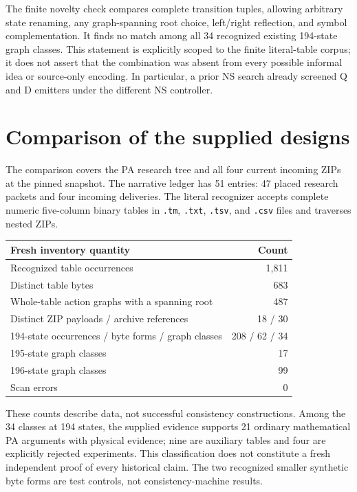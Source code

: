 \documentclass[11pt,letterpaper]{article}
\begin{document}
The finite novelty check compares complete transition tuples, allowing
arbitrary state renaming, any graph-spanning root choice, left/right
reflection, and symbol complementation. It finds no match among all 34
recognized existing 194-state graph classes. This statement is explicitly
scoped to the finite literal-table corpus; it does not assert that the
combination was absent from every possible informal idea or source-only
encoding. In particular, a prior NS search already screened Q and D
emitters under the different NS controller.

\section{Comparison of the supplied designs}
\label{sec:comparison}

The comparison covers the PA research tree and all four current incoming
ZIPs at the pinned snapshot\cite{repo}. The narrative ledger has 51 entries: 47 placed research
packets and four incoming deliveries. The literal recognizer accepts complete
numeric five-column binary tables in \texttt{.tm}, \texttt{.txt},
\texttt{.tsv}, and \texttt{.csv} files and traverses nested ZIPs.

\begin{center}
\begin{tabular}{lr}
\toprule
Fresh inventory quantity&Count\\\midrule
Recognized table occurrences&1,811\\
Distinct table bytes&683\\
Whole-table action graphs with a spanning root&487\\
Distinct ZIP payloads / archive references&18 / 30\\
194-state occurrences / byte forms / graph classes&208 / 62 / 34\\
195-state graph classes&17\\
196-state graph classes&99\\
Scan errors&0\\\bottomrule
\end{tabular}
\end{center}

These counts describe data, not successful consistency constructions. Among
the 34 classes at 194 states, the supplied evidence supports 21 ordinary
mathematical PA arguments with physical evidence; nine are auxiliary
tables and four are explicitly rejected experiments. This classification
does not constitute a fresh independent proof of every historical claim.
The two recognized smaller synthetic byte forms are test controls, not
consistency-machine results.
\end{document}
